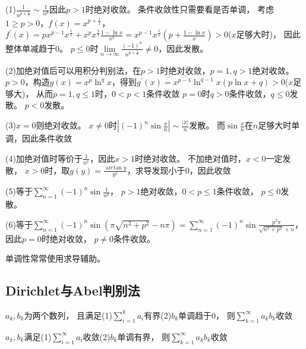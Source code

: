 \begin{solution}
  (1)$\frac{1}{n^{p + \frac{1}{n}}} \sim \frac{1}{n^p}$因此$p > 1$时绝对收敛。
  条件收敛性只需要看是否单调，
  考虑$1 \geq p > 0$，$f(x) = x^{p + \frac{1}{x}}$，
  $f^{\prime}(x) = p x^{p-1}x^{\frac{1}{x}} + x^p x^{\frac{1}{x}} \frac{1 - \ln x}{x^2} = x^{p-1}x^{\frac{1}{x}}(p + \frac{1 - \ln x}{x}) > 0$($x$足够大时)，
  因此整体单减趋于$0$。
  $p \leq 0$时$\lim \limits _{n \rightarrow \infty} \frac{(-1)^n}{n^{p + \frac{1}{n}}} \neq 0$，因此发散。

  (2)加绝对值后可以用积分判别法，在$p > 1$时绝对收敛，$p = 1, q > 1$绝对收敛。
  $p > 0$，构造$g(x) = x^p \ln^q x$，得到$g^{\prime}(x) = x^{p-1}\ln^{q-1} x(p \ln x + q) > 0$($x$足够大)，
  从而$p = 1, q \leq 1$时，$0 < p < 1$条件收敛
  $p = 0$时$q > 0$条件收敛，$q \leq 0$发散。
  $p < 0$发散。

  (3)$x = 0$则绝对收敛。
  $x \neq 0$时$|(-1)^n \sin \frac{x}{n}| \sim \frac{|x|}{n}$发散。
  而$\sin \frac{x}{n}$在$n$足够大时单调，因此条件收敛

  (4)加绝对值时等价于$\frac{1}{n^x}$，因此$x > 1$时绝对收敛。
  不加绝对值时，$x < 0$一定发散，
  $x > 0$时，取$g(y) = \frac{\arctan y}{y^x}$，求导发现小于$0$，因此收敛

  (5)等于$\sum\limits_{n = 1}^{\infty}(-1)^n \sin \frac{1}{n^p}$，
  $p > 1$绝对收敛，$0 < p \leq 1$条件收敛，
  $ p \leq 0$发散。

  (6)等于$\sum\limits_{n = 1}^{\infty}(-1)^n \sin(\pi \sqrt{n^2 + p^2} - n\pi) = \sum\limits_{n = 1}^{\infty}(-1)^n \sin \frac{p^2 \pi}{\sqrt{n^2 + p^2} + n}$，
  因此$p = 0$时绝对收敛，
  $p \neq 0$条件收敛。
\end{solution}

\begin{note}
  单调性常常使用求导辅助。
\end{note}

\subsection{Dirichlet与Abel判别法}

\begin{theorem}[Dirichlet判别法]
  $a_k,b_k$为两个数列，
  且满足(1)$\sum\limits_{i = 1}^k a_i$有界(2)$b_k$单调趋于$0$，
  则$\sum\limits_{k = 1}^{\infty}a_kb_k$收敛
\end{theorem}

\begin{theorem}[Abel判别法]
  $a_k,b_k$满足(1)$\sum\limits_{i = 1}^{\infty}a_i$收敛(2)$b_k$单调有界，
  则$\sum\limits_{k=1}^{\infty}a_kb_k$收敛
\end{theorem}

